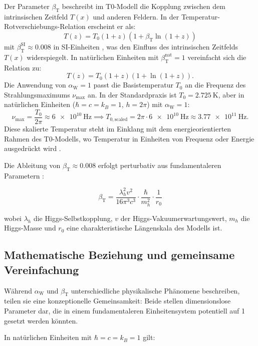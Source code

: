 \documentclass[12pt,a4paper]{article}
\newcommand{\Tfield}{T(x)}
\newcommand{\betaT}{\beta_{\text{T}}}
\newcommand{\alphaW}{\alpha_{\text{W}}}
\begin{document}
	Der Parameter \(\betaT\) beschreibt im T0-Modell die Kopplung zwischen dem intrinsischen Zeitfeld \(\Tfield\) und anderen Feldern. In der Temperatur-Rotverschiebungs-Relation erscheint er als:
	\begin{equation}
		T(z) = T_0 (1 + z) (1 + \betaT \ln(1 + z))
	\end{equation}
	mit \(\betaT^{\text{SI}} \approx 0.008\) in SI-Einheiten \cite{pascher_messdifferenzen_2025}, was den Einfluss des intrinsischen Zeitfelds \(\Tfield\) widerspiegelt. In natürlichen Einheiten mit \(\betaT^{\text{nat}} = 1\) vereinfacht sich die Relation zu:
	\[
	T(z) = T_0 (1 + z) (1 + \ln(1 + z)).
	\]
	Die Anwendung von \(\alphaW = 1\) passt die Basistemperatur \(T_0\) an die Frequenz des Strahlungsmaximums \(\nu_{\text{max}}\) an. In der Standardpraxis ist \(T_0 = \SI{2.725}{\kelvin}\), aber in natürlichen Einheiten (\(\hbar = c = k_B = 1\), \(h = 2\pi\)) mit \(\alphaW = 1\):
	\[
	\nu_{\text{max}} = \frac{T_0}{2\pi} \approx \SI{6e10}{\hertz} \implies T_{0,\text{scaled}} = 2\pi \cdot \SI{6e10}{\hertz} \approx \SI{3.77e11}{\hertz}.
	\]
	Diese skalierte Temperatur steht im Einklang mit dem energieorientierten Rahmen des T0-Modells, wo Temperatur in Einheiten von Frequenz oder Energie ausgedrückt wird \cite{pascher_alpha_2025}.
	
	Die Ableitung von \(\betaT \approx 0.008\) erfolgt perturbativ aus fundamentaleren Parametern \cite{pascher_params_2025}:
	
	\begin{equation}
		\betaT = \frac{\lambda_h^2 v^2}{16\pi^3 c^3} \cdot \frac{\hbar}{m_h^2} \cdot \frac{1}{r_0}
	\end{equation}
	
	wobei \(\lambda_h\) die Higgs-Selbstkopplung, \(v\) der Higgs-Vakuumerwartungswert, \(m_h\) die Higgs-Masse und \(r_0\) eine charakteristische Längenskala des Modells ist.
	
	\subsection{Mathematische Beziehung und gemeinsame Vereinfachung}
	
	Während \(\alphaW\) und \(\betaT\) unterschiedliche physikalische Phänomene beschreiben, teilen sie eine konzeptionelle Gemeinsamkeit: Beide stellen dimensionslose Parameter dar, die in einem fundamentaleren Einheitensystem potentiell auf 1 gesetzt werden könnten.
	
	In natürlichen Einheiten mit \(\hbar = c = k_B = 1\) gilt:
	
\end{document}
